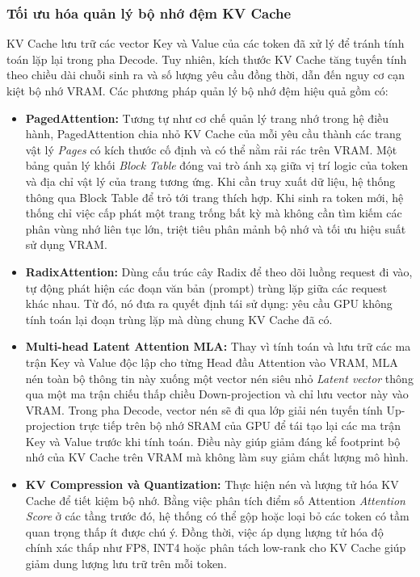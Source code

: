 \subsubsection{Tối ưu hóa quản lý bộ nhớ đệm KV Cache}
KV Cache lưu trữ các vector Key và Value của các token đã xử lý để tránh tính toán lặp lại trong pha Decode. Tuy nhiên, kích thước KV Cache tăng tuyến tính theo chiều dài chuỗi sinh ra và số lượng yêu cầu đồng thời, dẫn đến nguy cơ cạn kiệt bộ nhớ VRAM. Các phương pháp quản lý bộ nhớ đệm hiệu quả gồm có:
\begin{itemize}
    \item \textbf{PagedAttention:} Tương tự như cơ chế quản lý trang nhớ trong hệ điều hành, PagedAttention chia nhỏ KV Cache của mỗi yêu cầu thành các trang vật lý \textit{Pages} có kích thước cố định và có thể nằm rải rác trên VRAM. Một bảng quản lý khối \textit{Block Table} đóng vai trò ánh xạ giữa vị trí logic của token và địa chỉ vật lý của trang tương ứng. Khi cần truy xuất dữ liệu, hệ thống thông qua Block Table để trỏ tới trang thích hợp. Khi sinh ra token mới, hệ thống chỉ việc cấp phát một trang trống bất kỳ mà không cần tìm kiếm các phân vùng nhớ liên tục lớn, triệt tiêu phân mảnh bộ nhớ và tối ưu hiệu suất sử dụng VRAM.
    \item \textbf{RadixAttention:} Dùng cấu trúc cây Radix để theo dõi luồng request đi vào, tự động phát hiện các đoạn văn bản (prompt) trùng lặp giữa các request khác nhau. Từ đó, nó đưa ra quyết định tái sử dụng: yêu cầu GPU không tính toán lại đoạn trùng lặp mà dùng chung KV Cache đã có.
    \item \textbf{Multi-head Latent Attention MLA:} Thay vì tính toán và lưu trữ các ma trận Key và Value độc lập cho từng Head đầu Attention vào VRAM, MLA nén toàn bộ thông tin này xuống một vector nén siêu nhỏ \textit{Latent vector} thông qua một ma trận chiếu thấp chiều Down-projection và chỉ lưu vector này vào VRAM. Trong pha Decode, vector nén sẽ đi qua lớp giải nén tuyến tính Up-projection trực tiếp trên bộ nhớ SRAM của GPU để tái tạo lại các ma trận Key và Value trước khi tính toán. Điều này giúp giảm đáng kể footprint bộ nhớ của KV Cache trên VRAM mà không làm suy giảm chất lượng mô hình.
    \item \textbf{KV Compression và Quantization:} Thực hiện nén và lượng tử hóa KV Cache để tiết kiệm bộ nhớ. Bằng việc phân tích điểm số Attention \textit{Attention Score} ở các tầng trước đó, hệ thống có thể gộp hoặc loại bỏ các token có tầm quan trọng thấp ít được chú ý. Đồng thời, việc áp dụng lượng tử hóa độ chính xác thấp như FP8, INT4 hoặc phân tách low-rank cho KV Cache giúp giảm dung lượng lưu trữ trên mỗi token.
\end{itemize}

